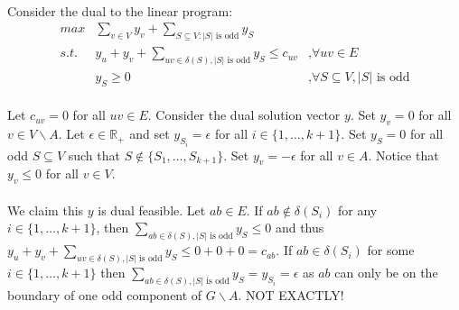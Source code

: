 \documentclass[letterpaper,12pt,oneside,onecolumn]{report}
\begin{document}
\paragraph{}
Consider the dual to the linear program:
\begin{align*}
max &\sum_{v\in V} y_v + \sum_{S\subseteq V: |S| \text{ is odd}} y_S \\
s.t. &y_u + y_v + \sum_{uv \in \delta(S), |S| \text{ is odd}} y_S \leq c_{uv} &\text{,}\forall uv \in E \\
&y_S \geq 0 &\text{,}\forall S\subseteq V, |S| \text{ is odd}
\end{align*}
\paragraph{}
Let $c_{uv} = 0$ for all $uv \in E$. Consider the dual solution vector $y$. Set $y_v=0$ for all $v \in V\backslash A$. Let $\epsilon \in \mathbb{R}_+$ and set $y_{S_i} = \epsilon$ for all $i \in \{1, \dots, k+1\}$. Set $y_{S} = 0$ for all odd $S \subseteq V$ such that $S \not \in \{S_1, \dots, S_{k+1}\}$. Set $y_v = -\epsilon$ for all $v \in A$. Notice that $y_v \leq 0$ for all $v \in V$.
\paragraph{}
We claim this $y$ is dual feasible. Let $ab \in E$. If $ab \not\in \delta(S_i)$ for any $i \in \{1, \dots, k+1\}$, then $\sum_{ab \in \delta(S), |S| \text{ is odd}} y_S \leq 0 $ and thus $y_u + y_v + \sum_{uv \in \delta(S), |S| \text{ is odd}} y_S \leq 0 + 0 + 0 = c_{ab}$. If $ab \in \delta(S_i)$  for some $i \in \{1, \dots, k+1\}$ then $\sum_{ab \in \delta(S), |S| \text{ is odd}} y_S = y_{S_i} = \epsilon$ as $ab$ can only be on the boundary of one odd component of $G\backslash A$. NOT EXACTLY!
\end{document}
